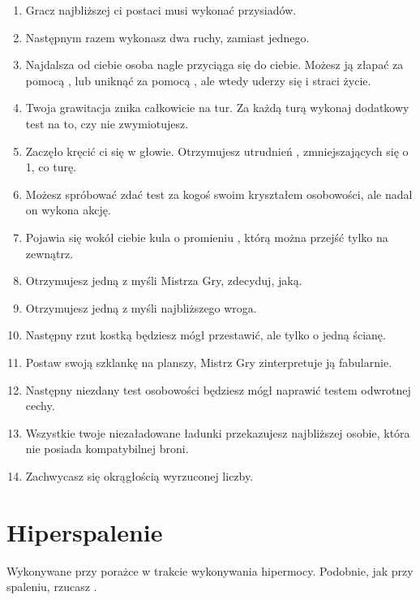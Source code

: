 \begin{enumerate}
	\item Gracz najbliższej ci postaci musi wykonać \dxx{} przysiadów.
	\item Następnym razem wykonasz dwa ruchy, zamiast jednego.
	\item Najdalsza od ciebie osoba nagle przyciąga się do ciebie. Możesz ją złapać za pomocą \abs{}, lub uniknąć za pomocą \aba{}, ale wtedy uderzy się i straci życie.
	\item Twoja grawitacja znika całkowicie na \diiii{} tur. Za każdą turą wykonaj dodatkowy test \abp{} na to, czy nie zwymiotujesz.
	\item Zaczęło kręcić ci się w głowie. Otrzymujesz \diiii{} utrudnień \abp{}, zmniejszających się o 1, co turę.
	\item Możesz spróbować zdać test za kogoś swoim kryształem osobowości, ale nadal on wykona akcję.
	\item Pojawia się wokół ciebie kula o promieniu \diiii{}, którą można przejść tylko na zewnątrz.
	\item Otrzymujesz jedną z myśli Mistrza Gry, zdecyduj, jaką.
	\item Otrzymujesz jedną z myśli najbliższego wroga.
	\item Następny rzut kostką będziesz mógł przestawić, ale tylko o jedną ścianę.
	\item Postaw swoją szklankę na planszy, Mistrz Gry zinterpretuje ją fabularnie.
	\item Następny niezdany test osobowości będziesz mógł naprawić testem odwrotnej cechy.
	\item Wszystkie twoje niezaładowane ładunki przekazujesz najbliższej osobie, która nie posiada kompatybilnej broni.
	\item Zachwycasz się okrągłością wyrzuconej liczby.
	
\end{enumerate}

\section{Hiperspalenie}
Wykonywane przy porażce w trakcie wykonywania hipermocy. Podobnie, jak przy spaleniu, rzucasz \dc{}.

